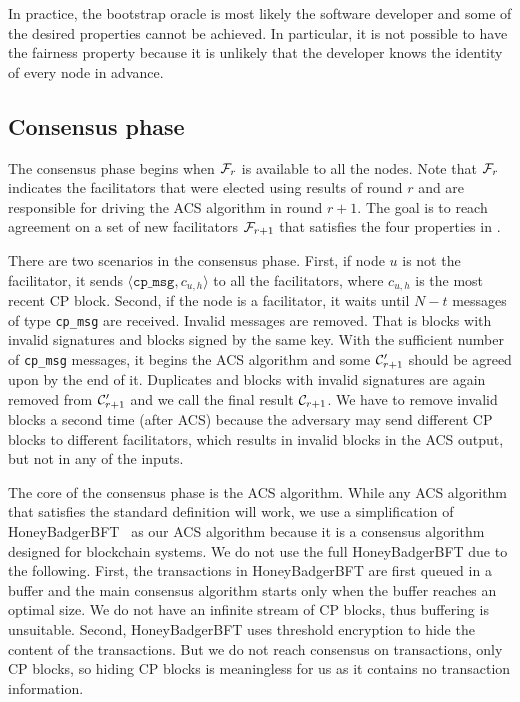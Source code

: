 In practice, the bootstrap oracle is most likely the software developer and some of the desired properties cannot be achieved.
In particular, it is not possible to have the fairness property because it is unlikely that the developer knows the identity of every node in advance.

\subsection{Consensus phase}
\label{sec:consensus-phase}
The consensus phase begins when $\mathcal{F}_r$ is available to all the nodes.
Note that $\mathcal{F}_r$ indicates the facilitators that were elected using results of round $r$ and are responsible for driving the ACS algorithm in round $r + 1$.
The goal is to reach agreement on a set of new facilitators $\mathcal{F}_{r + 1}$ that satisfies the four properties in .

There are two scenarios in the consensus phase.
First, if node $u$ is not the facilitator, it sends $\langle \texttt{cp\_msg}, c_{u, h} \rangle$ to all the facilitators,
where $c_{u, h}$ is the most recent CP block.
Second, if the node is a facilitator, it waits until $N - t$ messages of type \texttt{cp\_msg} are received.
Invalid messages are removed.
That is blocks with invalid signatures and blocks signed by the same key.
With the sufficient number of \texttt{cp\_msg} messages,
it begins the ACS algorithm and some $\mathcal{C}'_{r + 1}$ should be agreed upon by the end of it.
Duplicates and blocks with invalid signatures are again removed from $\mathcal{C}'_{r+1}$ and we call the final result $\mathcal{C}_{r+1}$.
We have to remove invalid blocks a second time (after ACS) because the adversary may send different CP blocks to different facilitators,
which results in invalid blocks in the ACS output, but not in any of the inputs.

The core of the consensus phase is the ACS algorithm.
While any ACS algorithm that satisfies the standard definition will work,
we use a simplification of HoneyBadgerBFT~\cite{miller2016honey} as our ACS algorithm 
because it is a consensus algorithm designed for blockchain systems.
We do not use the full HoneyBadgerBFT due to the following.
First, the transactions in HoneyBadgerBFT are first queued in a buffer and the main consensus algorithm starts only when the buffer reaches an optimal size.
We do not have an infinite stream of CP blocks, thus buffering is unsuitable.
Second, HoneyBadgerBFT uses threshold encryption to hide the content of the transactions.
But we do not reach consensus on transactions, only CP blocks, so hiding CP blocks is meaningless for us as it contains no transaction information.

